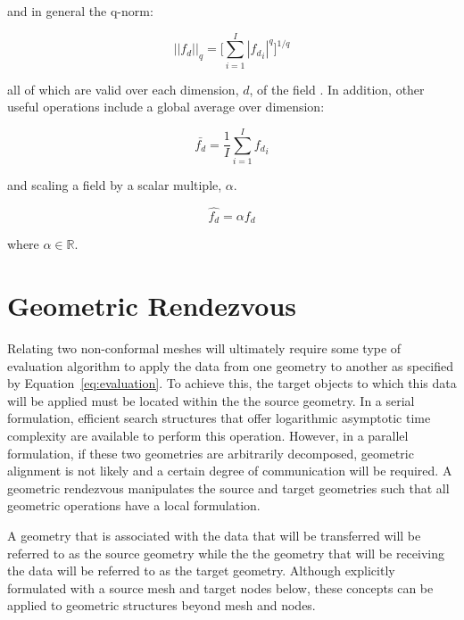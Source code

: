 \documentclass[letterpaper,12pt]{article}
\begin{document}
and in general the q-norm:

\begin{equation}
||f_d||_q = \Bigg[ \sum_{i=1}^I |{f_d}_i|^q \Bigg]^{1/q}
  \label{eq:q_norm}
\end{equation}

all of which are valid over each dimension, $d$, of the field
\cite{LeVeque_2007}. In addition, other useful operations include a
global average over dimension:

\begin{equation}
  \bar{f_d} = \frac{1}{I}\sum_{i=1}^I {f_d}_i
  \label{eq:average}
\end{equation}

and scaling a field by a scalar multiple, $\alpha$.

\begin{equation}
  \hat{f_d} = \alpha f_d
  \label{eq:field_scaling}
\end{equation}

where $\alpha \in \mathbb{R}$.

\clearpage

\section{Geometric Rendezvous}\label{sec:rendezvous}
Relating two non-conformal meshes will ultimately require some type of
evaluation algorithm to apply the data from one geometry to another as
specified by Equation~\ref{eq:evaluation}. To achieve this, the target
objects to which this data will be applied must be located within the
the source geometry. In a serial formulation, efficient search
structures that offer logarithmic asymptotic time complexity are
available to perform this operation. However, in a parallel
formulation, if these two geometries are arbitrarily decomposed,
geometric alignment is not likely and a certain degree of
communication will be required. A geometric rendezvous manipulates the
source and target geometries such that all geometric operations have a
local formulation.

A geometry that is associated with the data that will be transferred
will be referred to as the source geometry while the the geometry that
will be receiving the data will be referred to as the target
geometry. Although explicitly formulated with a source mesh and target
nodes below, these concepts can be applied to geometric structures
beyond mesh and nodes.
\end{document}
